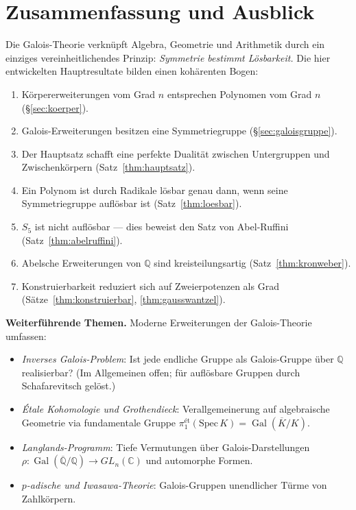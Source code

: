 \documentclass[12pt,a4paper]{amsart}
\theoremstyle{definition}
\newcommand{\Q}{\mathbb{Q}}
\newcommand{\C}{\mathbb{C}}
\newcommand{\Gal}{\operatorname{Gal}}
\begin{document}
\section{Zusammenfassung und Ausblick}

Die Galois-Theorie verknüpft Algebra, Geometrie und Arithmetik durch ein
einziges vereinheitlichendes Prinzip: \emph{Symmetrie bestimmt Lösbarkeit.}
Die hier entwickelten Hauptresultate bilden einen kohärenten Bogen:

\begin{enumerate}
  \item Körpererweiterungen vom Grad $n$ entsprechen Polynomen vom Grad $n$
        (§\ref{sec:koerper}).
  \item Galois-Erweiterungen besitzen eine Symmetriegruppe (§\ref{sec:galoisgruppe}).
  \item Der Hauptsatz schafft eine perfekte Dualität zwischen Untergruppen
        und Zwischenkörpern (Satz~\ref{thm:hauptsatz}).
  \item Ein Polynom ist durch Radikale lösbar genau dann, wenn seine
        Symmetriegruppe auflösbar ist (Satz~\ref{thm:loesbar}).
  \item $S_5$ ist nicht auflösbar — dies beweist den Satz von Abel-Ruffini
        (Satz~\ref{thm:abelruffini}).
  \item Abelsche Erweiterungen von $\Q$ sind kreisteilungsartig
        (Satz~\ref{thm:kronweber}).
  \item Konstruierbarkeit reduziert sich auf Zweierpotenzen als Grad
        (Sätze~\ref{thm:konstruierbar}, \ref{thm:gausswantzel}).
\end{enumerate}

\noindent\textbf{Weiterführende Themen.}
Moderne Erweiterungen der Galois-Theorie umfassen:
\begin{itemize}
  \item \emph{Inverses Galois-Problem}: Ist jede endliche Gruppe als Galois-Gruppe
        über $\Q$ realisierbar? (Im Allgemeinen offen; für auflösbare Gruppen
        durch Schafarevitsch gelöst.)
  \item \emph{Étale Kohomologie und Grothendieck}: Verallgemeinerung auf
        algebraische Geometrie via fundamentale Gruppe
        $\pi_1^{\text{ét}}(\mathrm{Spec}\,K) = \Gal(\overline{K}/K)$.
  \item \emph{Langlands-Programm}: Tiefe Vermutungen über Galois-Darstellungen
        $\rho: \Gal(\overline{\Q}/\Q) \to GL_n(\C)$ und automorphe Formen.
  \item \emph{$p$-adische und Iwasawa-Theorie}: Galois-Gruppen unendlicher
        Türme von Zahlkörpern.
\end{itemize}
\end{document}
